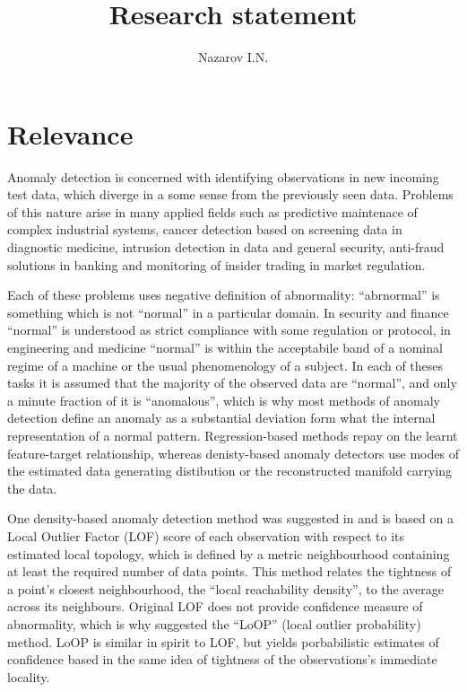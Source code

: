 \documentclass{extarticle}
\title{Research statement}
\author{Nazarov I.N.}
\begin{document}
\maketitle

\section{Relevance} %
\label{sec:relevance}

Anomaly detection is concerned with identifying observations in new incoming test
data, which diverge in a some sense from the previously seen data. Problems of this
nature arise in many applied fields such as predictive maintenace of complex industrial
systems, cancer detection based on screening data in diagnostic medicine, intrusion
detection in data and general security, anti-fraud solutions in banking and monitoring
of insider trading in market regulation.

Each of these problems uses negative definition of abnormality: ``abrnormal'' is
something which is not ``normal'' in a particular domain. In security and finance
``normal'' is understood as strict compliance with some regulation or protocol, in
engineering and medicine ``normal'' is within the acceptabile band of a nominal regime
of a machine or the usual phenomenology of a subject. In each of theses tasks it is
assumed that the majority of the observed data are ``normal'', and only a minute
fraction of it is ``anomalous'', which is why most methods of anomaly detection
define an anomaly as a substantial deviation form what the internal representation
of a normal pattern. Regression-based methods repay on the learnt feature-target
relationship, whereas denisty-based anomaly detectors use modes of the estimated
data generating distibution or the reconstructed manifold carrying the data.

One density-based anomaly detection method was suggested in \cite{breunig2000} and
is based on a Local Outlier Factor (LOF) score of each observation with respect to
its estimated local topology, which is defined by a metric neighbourhood containing
at least the required number of data points. This method relates the tightness of a
point's closest neighbourhood, the ``local reachability density'', to the average
across its neighbours. Original LOF does not provide confidence measure of abnormality,
which is why \cite{kriegel2009} suggested the ``LoOP'' (local outlier probability)
method. LoOP is similar in spirit to LOF, but yields porbabilistic estimates of
confidence based in the same idea of tightness of the observations's immediate locality.
\end{document}
